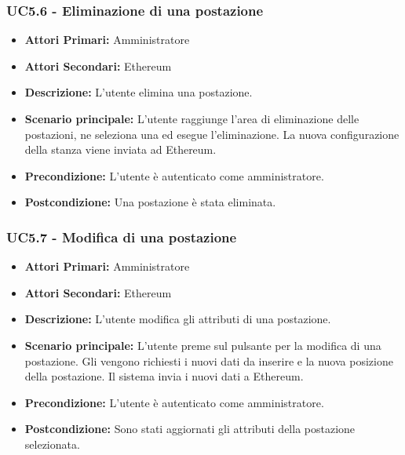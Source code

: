 \subsubsection{ UC5.6 - Eliminazione di una postazione}
\begin{itemize}
	\item\textbf{Attori Primari:}
	Amministratore 
	\item\textbf{Attori Secondari:}
	Ethereum
	\item\textbf{Descrizione:}
	L'utente elimina una postazione.
	\item\textbf{Scenario principale:} 
	L'utente raggiunge l'area di eliminazione delle postazioni, ne seleziona una ed esegue l'eliminazione. La nuova configurazione della stanza viene inviata ad Ethereum.
	\item\textbf{Precondizione:} 
	L'utente è autenticato come amministratore.
	\item\textbf{Postcondizione:}
	Una postazione è stata eliminata.
\end{itemize}

\subsubsection{ UC5.7 - Modifica di una postazione}
\begin{itemize}
	\item\textbf{Attori Primari:}
	Amministratore 
	\item\textbf{Attori Secondari:}
	Ethereum
	\item\textbf{Descrizione:}
	L'utente modifica gli attributi di una postazione.
	\item\textbf{Scenario principale:} 
	L'utente preme sul pulsante per la modifica di una postazione. Gli vengono richiesti i nuovi dati da inserire e la nuova posizione della postazione. Il sistema invia i nuovi dati a Ethereum.
	\item\textbf{Precondizione:} 
	L'utente è autenticato come amministratore.
	\item\textbf{Postcondizione:}
	Sono stati aggiornati gli attributi della postazione selezionata.
\end{itemize}

